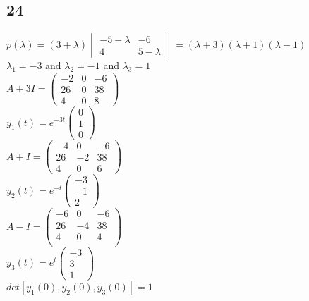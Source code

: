 \documentclass[12pt, a4paper]{IEEEtran}
\begin{document}
\begin{flushleft}
    \subsection*{24}
    $p(\lambda)=(3+\lambda)\begin{vmatrix}
        -5-\lambda&-6\\
        4&5-\lambda
    \end{vmatrix}=(\lambda+3)(\lambda+1)(\lambda-1)$\\
    $\lambda_1=-3$ and $\lambda_2=-1$ and $\lambda_3=1$\\
    $A+3I=\begin{pmatrix}
        -2&0&-6\\
        26&0&38\\
        4&0&8
    \end{pmatrix}$\\
    $y_1(t)=e^{-3t}\begin{pmatrix}
        0\\
        1\\
        0
    \end{pmatrix}$\\
    $A+I=\begin{pmatrix}
        -4&0&-6\\
        26&-2&38\\
        4&0&6
    \end{pmatrix}$\\
    $y_2(t)=e^{-t}\begin{pmatrix}
        -3\\
        -1\\
        2
    \end{pmatrix}$\\
    $A-I=\begin{pmatrix}
        -6&0&-6\\
        26&-4&38\\
        4&0&4\\
    \end{pmatrix}$\\
    $y_3(t)=e^t\begin{pmatrix}
        -3\\
        3\\
        1
    \end{pmatrix}$\\
    $det[y_1(0), y_2(0), y_3(0)]=1$




    \end{flushleft}
    
\end{document}
